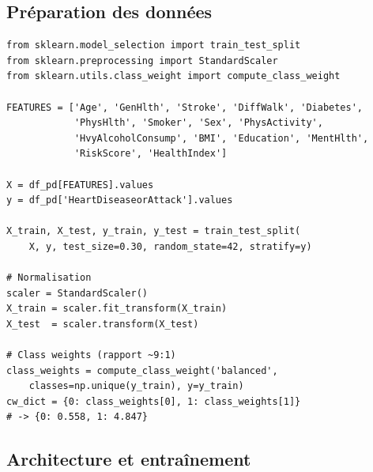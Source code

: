 \subsection{Préparation des données}

\begin{lstlisting}[caption=Préparation du jeu de données pour le DNN, label=lst:dnn_prep]
from sklearn.model_selection import train_test_split
from sklearn.preprocessing import StandardScaler
from sklearn.utils.class_weight import compute_class_weight

FEATURES = ['Age', 'GenHlth', 'Stroke', 'DiffWalk', 'Diabetes',
            'PhysHlth', 'Smoker', 'Sex', 'PhysActivity',
            'HvyAlcoholConsump', 'BMI', 'Education', 'MentHlth',
            'RiskScore', 'HealthIndex']

X = df_pd[FEATURES].values
y = df_pd['HeartDiseaseorAttack'].values

X_train, X_test, y_train, y_test = train_test_split(
    X, y, test_size=0.30, random_state=42, stratify=y)

# Normalisation
scaler = StandardScaler()
X_train = scaler.fit_transform(X_train)
X_test  = scaler.transform(X_test)

# Class weights (rapport ~9:1)
class_weights = compute_class_weight('balanced',
    classes=np.unique(y_train), y=y_train)
cw_dict = {0: class_weights[0], 1: class_weights[1]}
# -> {0: 0.558, 1: 4.847}
\end{lstlisting}

\subsection{Architecture et entraînement}

